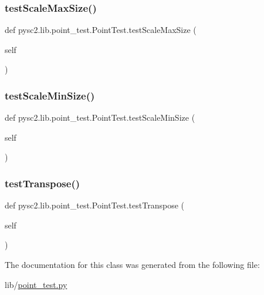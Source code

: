 \subsubsection{\texorpdfstring{test\+Scale\+Max\+Size()}{testScaleMaxSize()}}
{\footnotesize\ttfamily def pysc2.\+lib.\+point\+\_\+test.\+Point\+Test.\+test\+Scale\+Max\+Size (\begin{DoxyParamCaption}\item[{}]{self }\end{DoxyParamCaption})}

\mbox{\label{classpysc2_1_1lib_1_1point__test_1_1_point_test_a4a1bbfdbfcb124ef6711f9f80e74751d}} 
\subsubsection{\texorpdfstring{test\+Scale\+Min\+Size()}{testScaleMinSize()}}
{\footnotesize\ttfamily def pysc2.\+lib.\+point\+\_\+test.\+Point\+Test.\+test\+Scale\+Min\+Size (\begin{DoxyParamCaption}\item[{}]{self }\end{DoxyParamCaption})}

\mbox{\label{classpysc2_1_1lib_1_1point__test_1_1_point_test_af76618e86853e5aaa46189849b05fba8}} 
\subsubsection{\texorpdfstring{test\+Transpose()}{testTranspose()}}
{\footnotesize\ttfamily def pysc2.\+lib.\+point\+\_\+test.\+Point\+Test.\+test\+Transpose (\begin{DoxyParamCaption}\item[{}]{self }\end{DoxyParamCaption})}



The documentation for this class was generated from the following file\+:\begin{DoxyCompactItemize}
\item 
lib/\mbox{\hyperlink{point__test_8py}{point\+\_\+test.\+py}}\end{DoxyCompactItemize}

